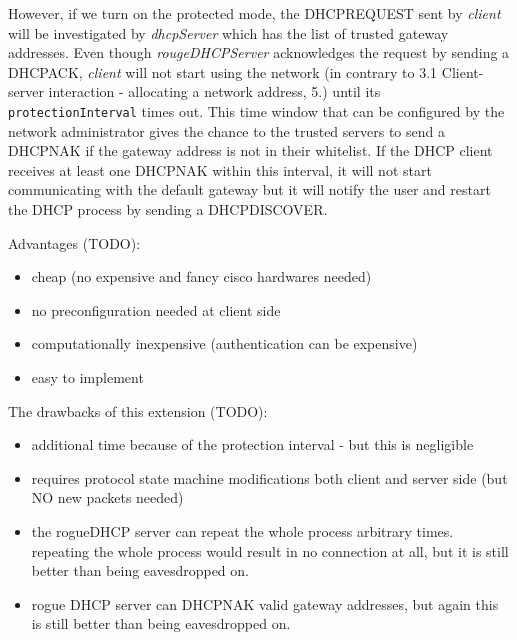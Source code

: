 \documentclass[letterpaper, 10 pt, conference]{ieeeconf}  %
\begin{document}
However, if we turn on the protected mode, the DHCPREQUEST sent by \textit{client} will be investigated by \textit{dhcpServer} which has the list of trusted gateway addresses. Even though \textit{rougeDHCPServer} acknowledges the request by sending a DHCPACK, \textit{client} will not start using the network (in contrary to \cite{dhcprfc} 3.1 Client-server interaction - allocating a network address, 5.) until its \texttt{protectionInterval} times out. This time window that can be configured by the network administrator gives the chance to the trusted servers to send a DHCPNAK if the gateway address is not in their whitelist. If the DHCP client receives at least one DHCPNAK within this interval, it will not start communicating with the default gateway but it will notify the user and restart the DHCP process by sending a DHCPDISCOVER.

Advantages (TODO):
\begin{itemize}
\item cheap (no expensive and fancy cisco hardwares needed)
\item no preconfiguration needed at client side
\item computationally inexpensive (authentication can be expensive)
\item easy to implement
\end{itemize}

The drawbacks of this extension (TODO):
\begin{itemize}
\item additional time because of the protection interval - but this is negligible
\item requires protocol state machine modifications both client and server side (but NO new packets needed)
\item the rogueDHCP server can repeat the whole process arbitrary times. repeating the whole process would result in no connection at all,
but it is still better than being eavesdropped on.
\item rogue DHCP server can DHCPNAK valid gateway addresses, but again this is still better than being eavesdropped on.
\end{itemize}
\addtolength{\textheight}{-12cm}   %
\end{document}
